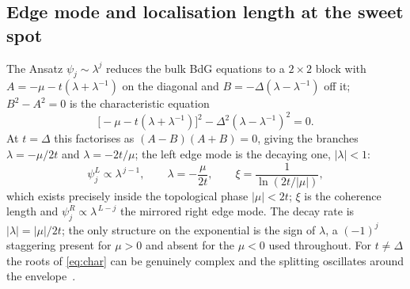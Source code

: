 \subsection{Edge mode and localisation length at the sweet spot}
\label{sec:edgemode}
The Ansatz $\psi_j \sim \lambda^j$ reduces the bulk BdG equations to a
$2\times2$ block with $A = -\mu - t(\lambda+\lambda^{-1})$ on the diagonal and
$B = -\Delta(\lambda-\lambda^{-1})$ off it; $B^2 - A^2 = 0$ is the
characteristic equation
\begin{equation}
  \bigl[-\mu - t(\lambda + \lambda^{-1})\bigr]^2
  - \Delta^2(\lambda - \lambda^{-1})^2 = 0 .
  \label{eq:char}
\end{equation}
At $t = \Delta$ this factorises as $(A-B)(A+B) = 0$, giving the branches
$\lambda = -\mu/2t$ and $\lambda = -2t/\mu$; the left edge mode is the
decaying one, $|\lambda| < 1$:
\begin{equation}
  \psi_j^{L} \propto \lambda^{\,j-1}, \qquad
  \lambda = -\frac{\mu}{2t}, \qquad
  \xi = \frac{1}{\ln(2t/|\mu|)},
  \label{eq:leftmode}
\end{equation}
which exists precisely inside the topological phase $|\mu| < 2t$; $\xi$ is the
coherence length and $\psi_j^{R} \propto \lambda^{\,L-j}$ the mirrored right
edge mode. The decay rate is $|\lambda| = |\mu|/2t$; the only structure on the
exponential is the sign of $\lambda$, a $(-1)^j$ staggering present for
$\mu > 0$ and absent for the $\mu < 0$ used throughout. For $t \neq \Delta$
the roots of \eqref{eq:char} can be genuinely complex and the splitting
oscillates around the envelope~\cite{dassarma2012,hegde2016}.


